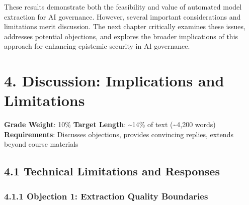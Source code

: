 \documentclass[
  11pt,
  letterpaper,
]{book}
\begin{document}
These results demonstrate both the feasibility and value of automated
model extraction for AI governance. However, several important
considerations and limitations merit discussion. The next chapter
critically examines these issues, addresses potential objections, and
explores the broader implications of this approach for enhancing
epistemic security in AI governance.


\chapter*{4. Discussion: Implications and
Limitations}\label{sec-discussion}


\begin{tcolorbox}[enhanced jigsaw, opacitybacktitle=0.6, colbacktitle=quarto-callout-note-color!10!white, toptitle=1mm, colback=white, breakable, left=2mm, bottomrule=.15mm, title=\textcolor{quarto-callout-note-color}{\faInfo}\hspace{0.5em}{Chapter Overview}, rightrule=.15mm, arc=.35mm, toprule=.15mm, opacityback=0, colframe=quarto-callout-note-color-frame, bottomtitle=1mm, titlerule=0mm, leftrule=.75mm, coltitle=black]

\textbf{Grade Weight}: 10\% \textbar{} \textbf{Target Length}:
\textasciitilde14\% of text (\textasciitilde4,200 words)\\
\textbf{Requirements}: Discusses objections, provides convincing
replies, extends beyond course materials

\end{tcolorbox}

\section*{4.1 Technical Limitations and
Responses}\label{sec-technical-limitations}


\subsection*{4.1.1 Objection 1: Extraction Quality
Boundaries}\label{sec-extraction-boundaries}
\end{document}
